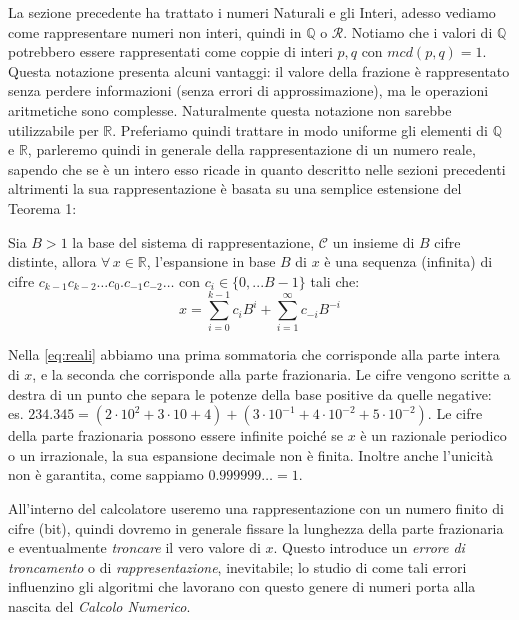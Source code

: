 La sezione precedente ha trattato i numeri Naturali e gli Interi, adesso vediamo come rappresentare numeri non interi, quindi in $\mathbb{Q}$ o $\mathcal{R}$. Notiamo che i valori di $\mathbb{Q}$ potrebbero essere rappresentati
come coppie di interi $p, q$ con $mcd(p,q) = 1$. Questa notazione presenta alcuni
vantaggi: il valore della frazione è rappresentato senza perdere informazioni
(senza errori di approssimazione), ma le operazioni aritmetiche sono complesse.
Naturalmente questa notazione non sarebbe utilizzabile per $\mathbb{R}$.
Preferiamo quindi trattare in modo uniforme gli elementi di $\mathbb{Q}$ e $\mathbb{R}$, parleremo quindi in generale della rappresentazione di un numero
reale, sapendo che se è un intero esso ricade in quanto descritto nelle sezioni
precedenti altrimenti la sua rappresentazione è basata su una semplice estensione del Teorema 1:

\begin{thm}
\label{thm:F}
Sia $B>1$ la base del sistema di rappresentazione, $\mathcal{C}$ un insieme
di $B$ cifre distinte, allora $\forall\, x \in \mathbb{R}$, l'espansione in base $B$ di $x$ è una sequenza (infinita) di cifre $c_{k-1}c_{k-2}{\ldots}c_0.c_{-1}c_{-2}\ldots$ con $c_i \in \{0,...B-1\}$ tali che:
\begin{equation}\label{eq:reali} 
	x = \sum_{i=0}^{k-1} c_iB^i + \sum_{i=1}^{\infty} c_{-i}B^{-i} 
\end{equation}
\end{thm}

Nella \eqref{eq:reali} abbiamo una prima sommatoria che corrisponde alla parte intera di $x$, e la seconda che corrisponde alla parte frazionaria. Le cifre vengono scritte a destra di un punto che separa le potenze della base positive da quelle negative: es. $234.345 = (2\cdot10^2+3\cdot10+4)+(3\cdot10^{-1}+4\cdot10^{-2}+5\cdot10^{-2})$. Le cifre della parte frazionaria possono essere infinite poiché se $x$ è un razionale periodico o un irrazionale, la sua espansione decimale non è finita.
Inoltre anche l'unicità non è garantita, come sappiamo $0.999999\ldots = 1$.

All'interno del calcolatore useremo una rappresentazione con un numero finito di cifre (bit), quindi dovremo in generale fissare la lunghezza della parte frazionaria e eventualmente \emph{troncare} il vero valore di $x$. Questo introduce un \emph{errore di troncamento} o di \emph{rappresentazione}, inevitabile; lo studio di come tali errori influenzino gli algoritmi che lavorano con questo genere di numeri porta alla nascita del \emph{Calcolo Numerico}. 

